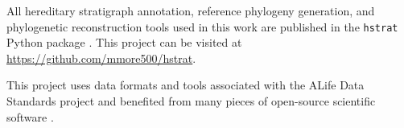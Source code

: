 All hereditary stratigraph annotation, reference phylogeny generation, and phylogenetic reconstruction tools used in this work are published in the \texttt{hstrat} Python package \citep{moreno2022hstrat}.
This project can be visited at \url{https://github.com/mmore500/hstrat}.

This project uses data formats and tools associated with the ALife Data Standards project \citep{lalejini2019data} and benefited from many pieces of open-source scientific software \citep{ofria2020empirical,sand2014tqdist,2020SciPy-NMeth,harris2020array,reback2020pandas,mckinney-proc-scipy-2010,sukumaran2010dendropy,cock2009biopython,dolson2024phylotrackpy,torchiano2016effsize,waskom2021seaborn,hunter2007matplotlib,moreno2024apc,moreno2024qspool,moreno2023teeplot,hagen2021gen3sis,ofria2004avida,torchiano2016effsize}.